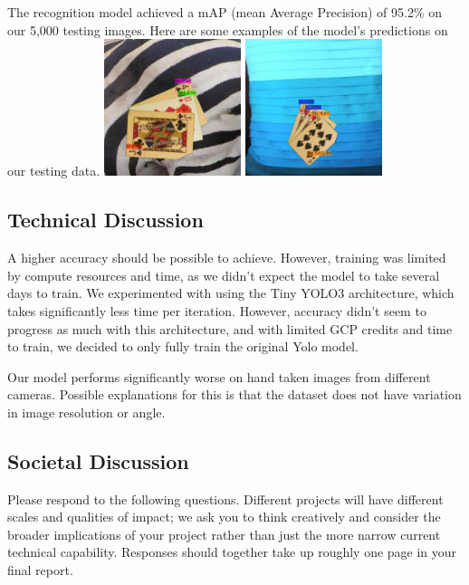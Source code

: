 \documentclass[10pt,twocolumn,letterpaper]{article}
\begin{document}
The recognition model achieved a mAP (mean Average Precision) of 95.2\% on our 5,000 testing images. 
Here are some examples of the model's predictions on our testing data.
\includegraphics[width=4cm]{predictions (17).jpg}
\includegraphics[width=4cm]{predictions (20).jpg}


\subsection{Technical Discussion}

A higher accuracy should be possible to achieve. However, training was limited by compute resources and time, as we didn't expect the model to take several days to train. We experimented with using the Tiny YOLO3 architecture, which takes significantly less time per iteration. However, accuracy didn't seem to progress as much with this architecture, and with limited GCP credits and time to train, we decided to only fully train the original Yolo model. 

Our model performs significantly worse on hand taken images from different cameras. Possible explanations for this is that the dataset does not have variation in image resolution or angle. 


\subsection{Societal Discussion}

Please respond to the following questions. Different projects will have different scales and qualities of impact; we ask you to think creatively and consider the broader implications of your project rather than just the more narrow current technical capability. Responses should together take up roughly one page in your final report.
\end{document}
